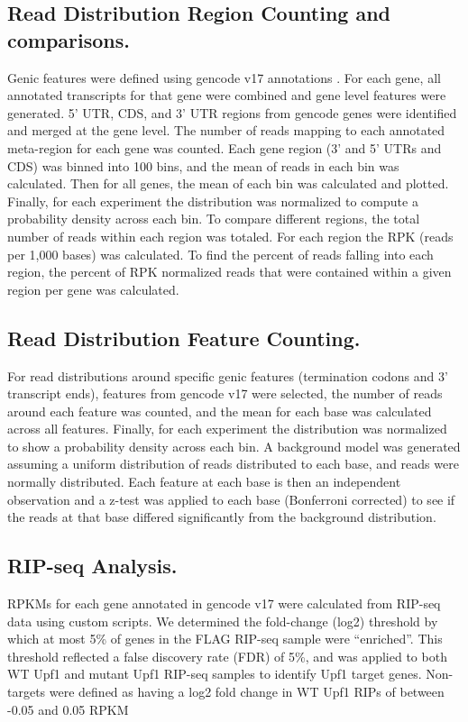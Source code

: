 \subsection{Read Distribution Region Counting and comparisons.}
Genic features were defined using gencode v17 annotations \cite{Harrow2006}. For each gene, all annotated transcripts for that gene were combined and gene level features were generated. 5' UTR, CDS, and 3' UTR regions from gencode genes were identified and merged at the gene level. The number of reads mapping to each annotated meta-region for each gene was counted. Each gene region (3' and 5' UTRs and CDS) was binned into 100 bins, and the mean of reads in each bin was calculated. Then for all genes, the mean of each bin was calculated and plotted. Finally, for each experiment the distribution was normalized to compute a probability density across each bin. To compare different regions, the total number of reads within each region was totaled. For each region the RPK (reads per 1,000 bases) was calculated. To find the percent of reads falling into each region, the percent of RPK normalized reads that were contained within a given region per gene was calculated.

\subsection{Read Distribution Feature Counting.}
For read distributions around specific genic features (termination codons and 3’ transcript ends), features from gencode v17 were selected, the number of reads around each feature was counted, and the mean for each base was calculated across all features. Finally, for each experiment the distribution was normalized to show a probability density across each bin. A background model was generated assuming a uniform distribution of reads distributed to each base, and reads were normally distributed. Each feature at each base is then an independent observation and a z-test was applied to each base (Bonferroni corrected) to see if the reads at that base differed significantly from the background distribution.

\subsection{RIP-seq Analysis.}
RPKMs for each gene annotated in gencode v17 were calculated from RIP-seq data using custom scripts. We determined the fold-change (log2) threshold by which at most 5\% of genes in the FLAG RIP-seq sample were “enriched”. This threshold reflected a false discovery rate (FDR) of 5\%, and was applied to both WT Upf1 and mutant Upf1 RIP-seq samples to identify Upf1 target genes. Non-targets were defined as having a log2 fold change in WT Upf1 RIPs of between -0.05 and 0.05 RPKM

